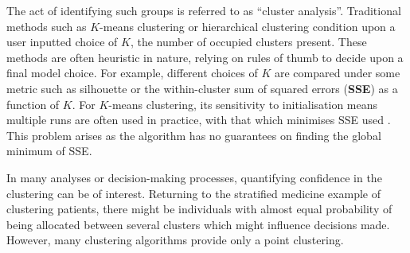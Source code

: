 \documentclass{bioinfo}
\begin{document}

The act of identifying such groups is referred to as “cluster analysis”. Traditional methods such as $K$-means clustering \citep{lloyd1982least, forgy1965cluster} or hierarchical clustering condition upon a user inputted choice of $K$, the number of occupied clusters present.  These methods are often heuristic in nature, relying on rules of thumb to decide upon a final model choice. For example, different choices of $K$ are compared under some metric such as silhouette or the within-cluster sum of squared errors (\textbf{SSE}) as a function of $K$. For $K$-means clustering, its sensitivity to initialisation means multiple runs are often used in practice, with that which minimises SSE used \citep{arthur2006k}. This problem arises as the algorithm has no guarantees on finding the global minimum of SSE.

In many analyses or decision-making processes, quantifying confidence in the clustering can be of interest. Returning to the stratified medicine example of clustering patients, there might be individuals with almost equal probability of being allocated between several clusters which might influence decisions made.
However, many clustering algorithms provide only a point clustering.
\end{document}
